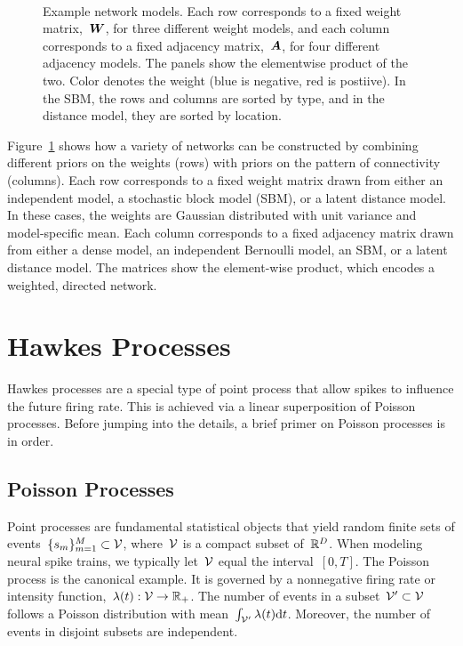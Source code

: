 \begin{figure}[t!]
\begin{subfigure}[b]{1.10in}
  \end{subfigure}
  \\
  \vspace{-.1in}
  \caption[Examples of network models]{Example network models.  Each
    row corresponds to a fixed weight matrix,~$\boldsymbol{W}$, for three
    different weight models, and each column corresponds to a fixed
    adjacency matrix,~$\boldsymbol{A}$, for four different adjacency models. The
    panels show the elementwise product of the two. Color denotes the
    weight (blue is negative, red is postiive).  In the SBM, the rows
    and columns are sorted by type, and in the distance model, they
    are sorted by location. }
  \label{fig:network_models}
\end{figure}

Figure~\ref{fig:network_models} shows how a variety of networks can be
constructed by combining different priors on the weights (rows) with
priors on the pattern of connectivity (columns). Each row corresponds
to a fixed weight matrix drawn from either an independent model, a
stochastic block model (SBM), or a latent distance model. In these
cases, the weights are Gaussian distributed with unit variance and
model-specific mean. Each column corresponds to a fixed adjacency
matrix drawn from either a dense model, an independent
Bernoulli model, an SBM, or a latent distance model. The matrices show
the element-wise product, which encodes a weighted, directed
network. 


\section{Hawkes Processes}
Hawkes processes \cite{Hawkes-1971} are a special type of point process
that allow spikes to influence the future firing rate. This is achieved
via a linear superposition of Poisson processes. Before jumping into the
details, a brief primer on Poisson processes is in order.

\subsection{Poisson Processes}
\sloppy Point processes are fundamental statistical objects that yield
random finite sets of events~${\{s_m\}_{m=1}^M \subset \mathcal{V}}$,
where~$\mathcal{V}$ is a compact subset of~${\mathbb{R}^D}$.  When modeling
neural spike trains, we typically let~${\mathcal{V}}$ equal the
interval~${[0,T]}$. The Poisson process is the canonical example. It
is governed by a nonnegative firing rate or intensity
function,~${\lambda(t): \mathcal{V} \rightarrow\mathbb{R}_+}$. The number of
events in a subset~${\mathcal{V}'\subset\mathcal{V}}$ follows a Poisson distribution
with mean~${\int_{\mathcal{V}'}\lambda(t)\mathrm{d}t}$. Moreover, the number
of events in disjoint subsets are independent.


